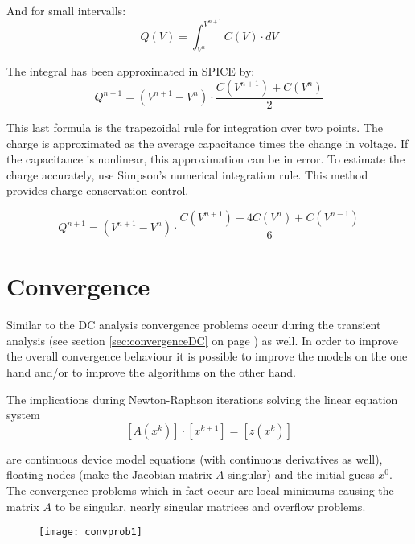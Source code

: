 And for small intervalls:
\begin{equation}
Q(V) = \int^{V^{n+1}}_{V^{n}} C(V)\cdot dV
\end{equation}

The integral has been approximated in SPICE by:
\begin{equation}
Q^{n+1} = \left(V^{n+1} - V^{n}\right)\cdot \dfrac{C(V^{n+1}) + C(V^{n})}{2}
\end{equation}

This last formula is the trapezoidal rule for integration over two
points.  The charge is approximated as the average capacitance times
the change in voltage.  If the capacitance is nonlinear, this
approximation can be in error.  To estimate the charge accurately, use
Simpson's numerical integration rule.  This method provides charge
conservation control.

\begin{equation}
Q^{n+1} = \left(V^{n+1} - V^{n}\right)\cdot \dfrac{C(V^{n+1}) + 4 C(V^{n}) + C(V^{n-1})}{6}
\end{equation}

\section{Convergence}

Similar to the DC analysis convergence problems occur during the
transient analysis (see section \ref{sec:convergenceDC} on page
\pageref{sec:convergenceDC}) as well.  In order to improve the overall
convergence behaviour it is possible to improve the models on the one
hand and/or to improve the algorithms on the other hand.

\addvspace{12pt}

The implications during Newton-Raphson iterations solving the linear
equation system
\begin{equation}
\left[A\left(x^k\right)\right] \cdot \left[x^{k+1}\right] = \left[z\left(x^k\right)\right]
\end{equation}

are continuous device model equations (with continuous derivatives as
well), floating nodes (make the Jacobian matrix $A$ singular) and the
initial guess $x^0$.  The convergence problems which in fact occur are
local minimums causing the matrix $A$ to be singular, nearly singular
matrices and overflow problems.

\begin{figure}[ht]
\begin{center}
\texttt{[image: convprob1]}
\end{center}
\label{fig:ConvProb1}
\end{figure}
\FloatBarrier

